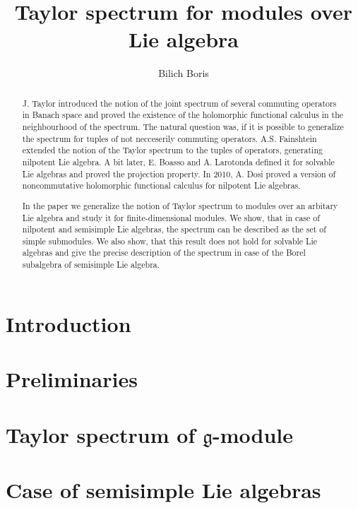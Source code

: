 \documentclass[letterpaper]{amsart}
\author{Bilich Boris}
\title{Taylor spectrum for modules over Lie algebra}
\newcommand{\lieg}{\mathfrak{g}}
\begin{document}
\maketitle

\begin{abstract}
    J. Taylor \cite{Taylor1970} introduced the notion of the joint spectrum of several commuting
    operators in Banach space and proved the existence of the holomorphic functional calculus in
    the neighbourhood of the spectrum. The natural question was, if it is possible to generalize
    the spectrum for tuples of not necceserily commuting operators. A.S. Fainshtein extended the
    notion of the Taylor spectrum to the tuples of operators, generating nilpotent Lie algebra. A
    bit later, E. Boasso and A. Larotonda defined it for solvable Lie algebras and proved the
    projection property. In 2010, A. Dosi proved a version of noncommutative holomorphic functional
    calculus for nilpotent Lie algebras.
    
    In the paper we generalize the notion of Taylor spectrum to modules over an arbitary Lie
    algebra and study it for finite-dimensional modules. We show, that in case of nilpotent and
    semisimple Lie algebras, the spectrum can be described as the set of simple submodules. We also
    show, that this result does not hold for solvable Lie algebras and give the precise description
    of the spectrum in case of the Borel subalgebra of semisimple Lie algebra.
\end{abstract}

\tableofcontents
\section{Introduction}%
\label{sec:introduction}


\section{Preliminaries}%
\label{sec:preliminaries}


\section{Taylor spectrum of \texorpdfstring{$\lieg$-module}{g-module}}%
\label{sec:spectrumofmodule}


\section{Case of semisimple Lie algebras}%
\label{sec:semisimple}

\end{document}
